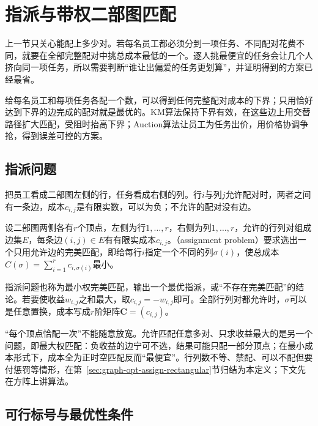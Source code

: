 
\section{指派与带权二部图匹配}
\label{sec:graph-assignment}

上一节只关心能配上多少对。若每名员工都必须分到一项任务、不同配对花费不同，就要在全部完整配对中挑总成本最低的一个。逐人挑最便宜的任务会让几个人挤向同一项任务，所以需要判断“谁让出偏爱的任务更划算”，并证明得到的方案已经最省。

给每名员工和每项任务各配一个数，可以得到任何完整配对成本的下界；只用恰好达到下界的边完成的配对就是最优的。KM算法保持下界有效，在这些边上用交替路径扩大匹配，受阻时抬高下界；Auction算法让员工为任务出价，用价格协调争抢，得到误差可控的方案。

\subsection{指派问题}
\label{sec:graph-opt-assign-problem}

把员工看成二部图左侧的行，任务看成右侧的列。行$i$与列$j$允许配对时，两者之间有一条边，成本$c_{i,j}$是有限实数，可以为负；不允许的配对没有边。

\begin{definition}[指派问题]
\label{def:graph-opt-assignment}
设二部图两侧各有$r$个顶点，左侧为行$1,\ldots,r$，右侧为列$1,\ldots,r$，允许的行列对组成边集$E$，每条边$(i,j)\in E$有有限实成本$c_{i,j}$。（assignment problem）要求选出一个只用允许边的完美匹配，即给每行$i$指定一个不同的列$\sigma(i)$，使总成本$C(\sigma)=\sum_{i=1}^r c_{i,\sigma(i)}$最小。
\end{definition}

指派问题也称为最小权完美匹配，输出一个最优指派，或“不存在完美匹配”的结论。若要使收益$w_{i,j}$之和最大，取$c_{i,j}=-w_{i,j}$即可。全部行列对都允许时，$\sigma$可以是任意置换，成本写成$r$阶矩阵$\bm C=(c_{i,j})$。

“每个顶点恰配一次”不能随意放宽。允许匹配任意多对、只求收益最大的是另一个问题，即最大权匹配：负收益的边宁可不选，结果可能只配一部分顶点；在最小成本形式下，成本全为正时空匹配反而“最便宜”。行列数不等、禁配、可以不配但要付惩罚等情形，在第~\ref{sec:graph-opt-assign-rectangular}节归结为本定义；下文先在方阵上讲算法。

\subsection{可行标号与最优性条件}
\label{sec:graph-opt-assign-labels}

